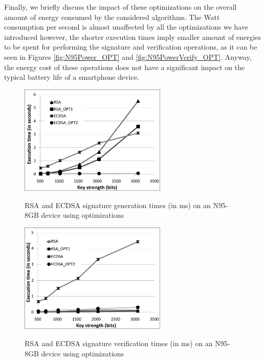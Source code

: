 \documentclass[authoryear]{elsarticle}
\begin{document}
Finally, we briefly discuss the impact of these optimizations on the overall amount of energy consumed by the considered algorithms. The Watt consumption per second is almost unaffected by all the optimizations we have introduced however, the shorter execution times imply smaller amount of energies to be spent for performing the signature and verification operations, as it can be seen in Figures \ref{fig:N95Power_OPT} and \ref{fig:N95PowerVerify_OPT}. Anyway, the energy cost of these operations does not have a significant impact on the typical battery life of a smartphone device. 

\clearpage 

 \begin{figure}[t]
\begin{center}
  \includegraphics[width=7cm]{immagini/Firme_OPT1_OPT2.pdf}\\
  \caption{RSA and ECDSA signature generation times (in ms) on an N95-8GB device using optimizations}
  \label{fig:Firme_OPT1_OPT2}
\end{center}
\end{figure}

\begin{figure}[h]
\begin{center}
  \includegraphics[width=7cm]{immagini/Verifiche_OPT1_OPT2.pdf}\\
  \caption{RSA and ECDSA signature verification times (in ms) on an N95-8GB device using optimizations}
  \label{fig:Verifiche_OPT1_OPT2}
\end{center}
\end{figure}
\end{document}
